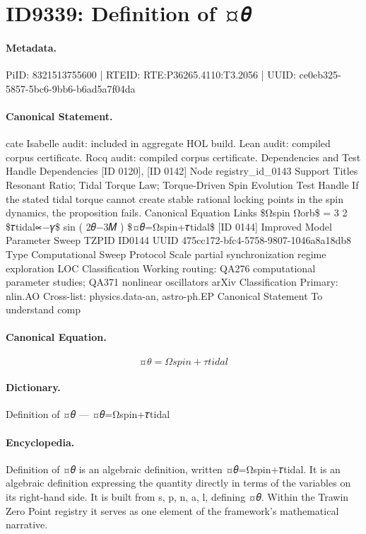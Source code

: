 \section*{ID9339: Definition of ¤𝜃}
\paragraph{Metadata.}
PiID: 8321513755600 | RTEID: RTE:P36265.4110:T3.2056 | UUID: ce0eb325-5857-5bc6-9bb6-b6ad5a7f04da

\paragraph{Canonical Statement.}
cate Isabelle audit: included in aggregate HOL build. Lean audit: compiled corpus certificate. Rocq audit: compiled corpus certificate. Dependencies and Test Handle Dependencies [ID 0120], [ID 0142] Node registry\_id\_0143 Support Titles Resonant Ratio; Tidal Torque Law; Torque-Driven Spin Evolution Test Handle If the stated tidal torque cannot create stable rational locking points in the spin dynamics, the proposition fails. Canonical Equation Links \$Ωspin Ωorb\$ = 3 2 \$𝜏tidal∝−𝛾\$ sin ( 2𝜃−3𝑀 ) \$¤𝜃=Ωspin+𝜏tidal\$ [ID 0144] Improved Model Parameter Sweep TZPID ID0144 UUID 475cc172-bfc4-5758-9807-1046a8a18db8 Type Computational Sweep Protocol Scale partial synchronization regime exploration LOC Classification Working routing: QA276 computational parameter studies; QA371 nonlinear oscillators arXiv Classification Primary: nlin.AO Cross-list: physics.data-an, astro-ph.EP Canonical Statement To understand comp

\paragraph{Canonical Equation.}
\[
¤𝜃=Ωspin+𝜏tidal
\]

\paragraph{Dictionary.}
Definition of ¤𝜃 — ¤𝜃=Ωspin+𝜏tidal

\paragraph{Encyclopedia.}
Definition of ¤𝜃 is an algebraic definition, written ¤𝜃=Ωspin+𝜏tidal. It is an algebraic definition expressing the quantity directly in terms of the variables on its right-hand side. It is built from s, p, n, a, l, defining ¤𝜃. Within the Trawin Zero Point registry it serves as one element of the framework's mathematical narrative.
